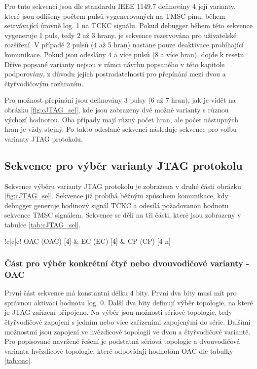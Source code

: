 Pro tuto sekvenci jsou dle standardu IEEE 1149.7 definovány 4 její varianty, které jsou odlišeny počtem pulsů vygenerovaných na \acs{TMSC} pinu, během setrvávající úrovně log. 1 na \acs{TCKC} signálu. Pokud debugger během této sekvence vygeneruje 1 puls, tedy 2 až 3 hrany, je sekvence rezervována pro uživatelské rozšíření. V případě 2 pulsů (4 až 5 hran) nastane pouze deaktivace probíhající komunikace. Pokud jsou odeslány 4 a více pulsů (8 a více hran), dojde k resetu. Dříve popsané varianty nejsou v rámci návrhu popsaného v této kapitole podporovány, z důvodu jejich postradatelnosti pro přepínání mezi dvou a čtyřvodičovým rozhraním. \cite{IEEE_1149-7}

Pro možnost přepínání jsou definovány 3 pulsy (6 až 7 hran), jak je vidět na obrázku \ref{fig:cJTAG_sel}, kde jsou zobrazeny dvě možné varianty s různou výchozí hodnotou. Oba případy mají různý počet hran, ale počet nástupných hran je vždy stejný. Po takto odeslané sekvenci následuje sekvence pro volbu varianty \acs{JTAG} protokolu.

\subsection{Sekvence pro výběr varianty \acs{JTAG} protokolu}
Sekvence výběru varianty \acs{JTAG} protokolu je zobrazena v druhé části obrázku \ref{fig:cJTAG_sel}. Sekvence již probíhá běžným způsobem komunikace, kdy debugger generuje hodinový signál \acs{TCKC} a odesílá požadovanou hodnotu sekvence \acs{TMSC} signálem. Sekvence se dělí na tři části, které jsou zobrazeny v tabulce \ref{tab:cJTAG_sel}.

\begin{table}[!h]
  \caption{Formát sekvence pro výběr varianty \acs{JTAG} protokolu \cite{IEEE_1149-7}}
  \begin{center}
  	\small
	  \begin{tabular}{!{\vrule width 1.2pt}c|c|c!{\vrule width 1.2pt}}
				\acl{OAC} (\acs{OAC}) [4] & \acl{EC} (\acs{EC}) [4] & \acl{CP} (\acs{CP}) [4-n]\\
		\end{tabular}
  \end{center}
	\label{tab:cJTAG_sel}
\end{table}

\subsubsection{Část pro výběr konkrétní čtyř nebo dvouvodičové varianty - \acs{OAC}}
První část sekvence má konstantní délku 4 bity. První dva bity musí mít pro správnou aktivaci hodnotu log. 0. Další dva bity definují výběr topologie, na které je \acs{JTAG} zařízení připojeno. Na výběr jsou možnosti sériové topologie, tedy čtyřvodičové zapojení s jedním nebo více zařízeními zapojenými do série. Dalšími možnostmi jsou zapojení ve hvězdicové topologii ve dvou a čtyřvodičové variantě. Pro popisované navržené řešení je podstatná sériová topologie a dvouvodičová varianta hvězdicové topologie, které odpovídají hodnotám \acs{OAC} dle tabulky \ref{tab:oac}. \cite{IEEE_1149-7}

